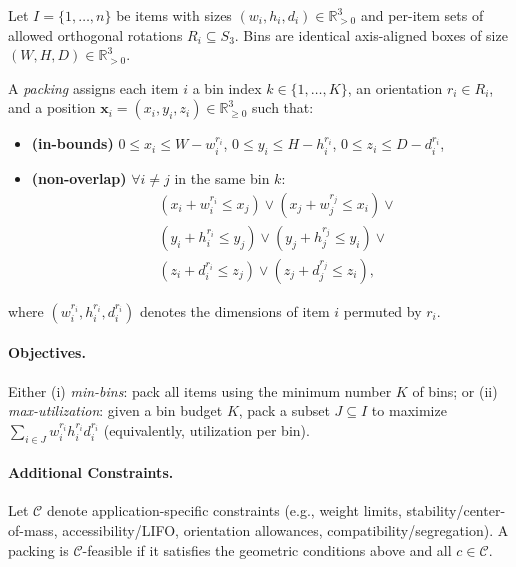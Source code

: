 \begin{definition}
\label{def:3dbpp}
Let $I = \{1,\ldots,n\}$ be items with sizes $(w_i, h_i, d_i) \in \mathbb{R}^3_{>0}$ and per-item sets of allowed orthogonal rotations $R_i \subseteq S_3$. Bins are identical axis-aligned boxes of size $(W, H, D) \in \mathbb{R}^3_{>0}$.

A \emph{packing} assigns each item $i$ a bin index $k \in \{1,\ldots,K\}$, an orientation $r_i \in R_i$, and a position $\mathbf{x}_i = (x_i, y_i, z_i) \in \mathbb{R}^3_{\geq 0}$ such that:

\begin{itemize}
    \item \textbf{(in-bounds)} $0 \leq x_i \leq W - w^{r_i}_i$, $0 \leq y_i \leq H - h^{r_i}_i$, $0 \leq z_i \leq D - d^{r_i}_i$,

    \item \textbf{(non-overlap)} $\forall i \neq j$ in the same bin $k$:
    \begin{align*}
    &(x_i + w^{r_i}_i \leq x_j) \lor (x_j + w^{r_j}_j \leq x_i) \lor \\
    &(y_i + h^{r_i}_i \leq y_j) \lor (y_j + h^{r_j}_j \leq y_i) \lor \\
    &(z_i + d^{r_i}_i \leq z_j) \lor (z_j + d^{r_j}_j \leq z_i),
    \end{align*}
\end{itemize}
where $(w^{r_i}_i, h^{r_i}_i, d^{r_i}_i)$ denotes the dimensions of item $i$ permuted by $r_i$.
\end{definition}

\paragraph{Objectives.}
Either (i) \textit{min-bins}: pack all items using the minimum number $K$ of bins; or (ii) \textit{max-utilization}: given a bin budget $K$, pack a subset $J \subseteq I$ to maximize $\sum_{i \in J} w^{r_i}_i h^{r_i}_i d^{r_i}_i$ (equivalently, utilization per bin).

\paragraph{Additional Constraints.}
Let $\mathcal{C}$ denote application-specific constraints (e.g., weight limits, stability/center-of-mass, accessibility/LIFO, orientation allowances, compatibility/segregation). A packing is $\mathcal{C}$-feasible if it satisfies the geometric conditions above and all $c \in \mathcal{C}$.

